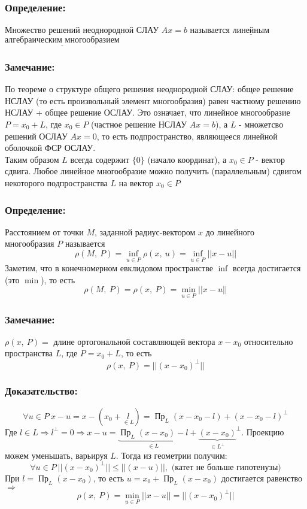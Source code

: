 \documentclass[12pt, letterpaper, twoside]{article}
\newcommand{\Underl}[1]{$\underline{\text{#1}}$}
\begin{document}
    \subsubsection*{Определение:}
    Множество решений неоднородной СЛАУ $Ax = b$ называется \Underl{линейным} \Underl{алгебраическим многообразием}
    \subsubsection*{Замечание:}
    По теореме о структуре общего решения неоднородной СЛАУ: общее решение НСЛАУ (то есть произвольный элемент многообразия) равен частному решению НСЛАУ + общее решение ОСЛАУ. Это означает, что линейное многообразие $P = x_0 + L$, где $x_0\in P$ (частное решение НСЛАУ $Ax = b$), а $L$ - множетсво решений ОСЛАУ $Ax = 0$, то есть подпространство, являющееся линейной оболочкой ФСР ОСЛАУ.\\
    Таким образом $L$ всегда содержит $\{0\}$ (начало координат), а $x_0\in P$ - вектор сдвига. Любое линейное многообразие можно получить (параллельным) сдвигом некоторого подпространства $L$ на вектор $x_0\in P$
    \subsubsection*{Определение:}
    Расстоянием от точки $M$, заданной радиус-вектором $x$ до линейного многообразия $P$ называется
    \[\rho(M,\ P) = \inf_{u\in P} \rho(x,\ u) = \inf_{u\in P} ||x - u|| \]
    Заметим, что в конечномерном евклидовом пространстве $\inf$ всегда достигается (это $\min$), то есть
    \[\rho(M,\ P) = \rho (x,\ P) = \min_{u\in P} ||x - u||\]
    \subsubsection*{Замечание:}
    $\rho(x,\ P) =$ длине ортогональной составляющей вектора $x - x_0$ относительно пространства $L$, где $P = x_0 + L$, то есть
    \[\rho(x,\ P) = ||(x - x_0)^{\bot}||\]
    \subsubsection*{Доказательство:}
    \[\forall u \in P\ x - u = x - (x_0 + \underset{\in L}{l}) = \operatorname{\text{Пр}}_L (x - x_0 - l) + (x - x_0 - l)^{\bot}\]
    Где $l\in L\Rightarrow l^{\bot} = 0\Rightarrow x - u = \underset{\in L}{\underbrace{\operatorname{\text{Пр}}_L(x - x_0) - l}} + \underset{\in L^{\bot}}{\underbrace{(x - x_0)}}^{\bot}$. Проекцию можем уменьшать, варьируя $L$. Тогда из геометрии получим:
    \[\forall u\in P\ ||(x - x_0)^{\bot}|| \leq ||(x - u)||,\text{ (катет не больше гипотенузы)}\]
    При $l = \operatorname{\text{Пр}}_L (x - x_0)$, то есть $u = x_0 + \operatorname{\text{Пр}}_L (x - x_0)$ достигается равенство$\Rightarrow$
    \[\rho(x,\ P) = \min_{u\in P} ||x - u|| = || (x - x_0)^{\bot}||\]
\end{document}
